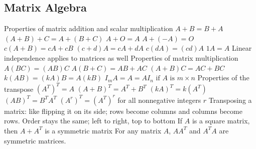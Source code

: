 \documentclass{article}
\begin{document}
       \subsection{Matrix Algebra}
       \begin{outline}
            \1 Properties of matrix addition and scalar multiplication
                \2 \(A+B=B+A\)
                \2 \((A+B)+C=A+(B+C)\)
                \2 \(A+O=A\)
                \2 \(A+(-A)=O\)
                \2 \(c(A+B)=cA+cB\)
                \2 \((c+d)A=cA+dA\)
                \2 \(c(dA)=(cd)A\)
                \2 \(1A=A\)
            \1 Linear independence applies to matrices as well
            \1 Properties of matrix multiplication 
                \2 \(A(BC)=(AB)C\)
                \2 \(A(B+C)=AB+AC\)
                \2 \((A+B)C=AC+BC\)
                \2 \(k(AB)=(kA)B=A(kB)\)
                \2 \(I_mA=A=AI_n\text{ if }A\text{ is }m\times n\)
            \1 Properties of the transpose
                \2 \((A^T)^T=A\)
                \2 \((A+B)^T=A^T+B^T\)
                \2 \((kA)^T=k(A^T)\)
                \2 \((AB)^T=B^TA^T\)
                \2 \((A^r)^T=(A^T)^r\) for all nonnegative integers $r$
            \1 Transposing a matrix: like flipping it on its side; rows become columns and columns become rows. Order stays the same; left to right, top to bottom
            \1 If \(A\) is a square matrix, then \(A+A^T\) is a symmetric matrix 
            \1 For any matrix $A$, \(AA^T\) and \(A^TA\) are symmetric matrices. 
       \end{outline}
\end{document}
